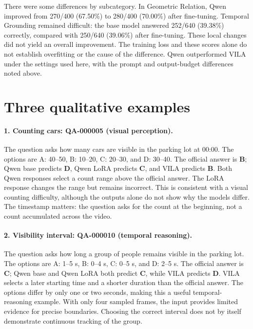 \documentclass[11pt]{article}
\begin{document}
There were some differences by subcategory. In Geometric Relation, Qwen
improved from 270/400 (67.50\%) to 280/400 (70.00\%) after fine-tuning.
Temporal Grounding remained difficult: the base model answered 252/640
(39.38\%) correctly, compared with 250/640 (39.06\%) after fine-tuning.
These local changes did not yield an overall improvement. The training loss
and these scores alone do not establish overfitting or the cause of the
difference. Qwen outperformed VILA under the settings used here, with the
prompt and output-budget differences noted above.

\section{Three qualitative examples}

\paragraph{1. Counting cars: QA-000005 (visual perception).}
The question asks how many cars are visible in the parking lot at 00:00.
The options are A: 40--50, B: 10--20, C: 20--30, and D: 30--40.
The official answer is \textbf{B}; Qwen base predicts \textbf{D}, Qwen LoRA
predicts \textbf{C}, and VILA predicts \textbf{B}.
Both Qwen responses select a count range above the official answer. The
LoRA response changes the range but remains incorrect. This is consistent
with a visual counting difficulty, although the outputs alone do not show
why the models differ. The timestamp matters: the question asks for the
count at the beginning, not a count accumulated across the video.

\newpage
\paragraph{2. Visibility interval: QA-000010 (temporal reasoning).}
The question asks how long a group of people remains visible in the parking
lot. The options are A: 1--5 s, B: 0--4 s, C: 0--5 s, and D: 2--5 s.
The official answer is \textbf{C}; Qwen base and Qwen LoRA both predict
\textbf{C}, while VILA predicts \textbf{D}.
VILA selects a later starting time and a shorter duration than the official
answer. The options differ by only one or two seconds, making this a useful
temporal-reasoning example. With only four sampled frames, the input provides
limited evidence for precise boundaries. Choosing the correct interval does
not by itself demonstrate continuous tracking of the group.
\end{document}
